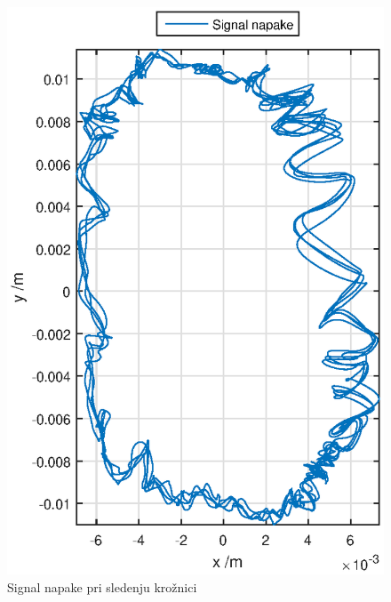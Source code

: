 \begin{figure}
	\centering
	\includegraphics[scale=0.5]{./Slike/torque_follow_circle_err.eps}
	\caption{Signal napake pri sledenju kro\v{z}nici}
	\label{fig:torque_follow_circle_err}
\end{figure}
